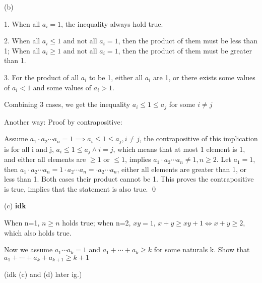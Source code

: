 \documentclass{article}
\begin{document}
(b) 

1. When all $a_i = 1$, the inequality always hold true.

2. When all $a_i \leq 1$ and not all $a_i=1$, then the product of them must be less than 1; When all $a_i \geq 1$ and not all $a_i=1$, then the product of them must be greater than 1.

3. For the product of all $a_i$ to be 1, either all $a_i$ are 1, or there exists some values of $a_i<1$ and some values of $a_i>1$.

Combining 3 cases, we get the inequality $a_i\leq 1\leq a_j$ for some $i\neq j$

Another way: Proof by contrapositive: 

Assume $a_1\cdot a_2 \cdots a_n=1 \implies a_i\leq1\leq a_j, i\neq j$, the contrapositive of this implication is for all i and j, $a_i\leq1\leq a_j \land i=j$, which means that at most 1 element is 1, and either all elements are $\geq 1$ or $\leq 1$, implies $a_1\cdot a_2 \cdots a_n\neq1, n\geq 2$. Let $a_1 =1$, then $a_1\cdot a_2 \cdots a_n = 1\cdot a_2 \cdots a_n = \cdot a_2 \cdots a_n$, either all elements are greater than 1, or less than 1. Both cases their product cannot be 1. This proves the contrapositive is true, implies that the statement is also true. \qed

(c) \textbf{idk}

When n=1, $n\geq n$ holds true; when n=2, $xy=1$, $x+y\geq xy+1 \iff x+y\geq 2$, which also holds true. 

Now we assume $a_1\cdots a_k=1$ and $a_1+\cdots+a_k\geq k$ for some naturals k. Show that $a_1+\cdots+a_k+a_{k+1}\geq k+1$

(idk (c) and (d) later ig.)


 
\end{document}
